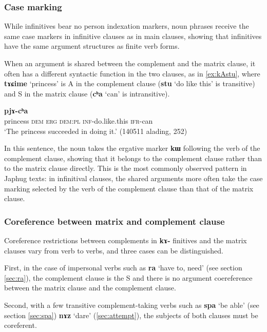 \documentclass[oneside,a4paper,11pt]{article}
\newcommand{\ipa}[1]{\textbf{\phon#1}} %
\newcommand{\jpg}[2]{\ipa{#1} `#2'} %
\begin{document}
\subsubsection{Case marking} \label{sec:case.infinitive}
While infinitives bear no person indexation markers, noun phrases receive the same case markers in infinitive clauses as in main clauses, showing that infinitives have the same argument structures as finite verb forms.

When an argument is shared between the complement and the matrix clause, it often has a different syntactic function in the two clauses, as in \ref{ex:kAstu}, where \ipa{tɤɕime} `princess' is A in the complement clause (\jpg{stu}{do like this} is transitive) and S in the matrix clause (\jpg{cʰa}{can} is intransitive). 

\begin{exe}
\ex \label{ex:kAstu}
\gll [\ipa{tɤɕime} 	\ipa{nɯ} 	\ipa{kɯ} 	\ipa{nɯra} 	\ipa{kɤ-stu}] 	\ipa{pjɤ-cʰa} \\
princess \textsc{dem} \textsc{erg} \textsc{dem:pl} \textsc{inf}-do.like.this \textsc{ifr}-can \\
\glt `The princess succeeded in doing it.' (140511 alading, 252)
\end{exe}

In this sentence, the noun takes the ergative marker \ipa{kɯ} following the verb of the complement clause, showing that it belongs to the complement clause rather than to the matrix clause directly. This is the most commonly observed pattern in Japhug texts: in infinitival clauses, the shared arguments more often take the case marking selected by the verb of the complement clause than that of the matrix clause.

\subsubsection{Coreference between matrix and complement clause} \label{sec:inf.coref}
Coreference restrictions between complements in \ipa{kɤ-} finitives and the matrix clauses vary from verb to verbs, and three cases can be distinguished.


First, in the case of impersonal verbs such as \jpg{ra}{have to, need} (see section \ref{sec:ra}), the complement clause is the S and there is no argument coereference between the matrix clause and the complement clause.

Second, with a few transitive complement-taking verbs such as \ipa{spa} `be able' (see section \ref{sec:spa})  \ipa{nɤz} `dare' (\ref{sec:attempt}), the subjects of both clauses must be coreferent.
\end{document}
